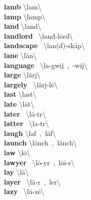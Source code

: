 \documentclass[10pt,a4paper]{article}
\begin{document}
\begin{multicols}{2}
\textbf{ lamb }\quad \textbackslash \textprimstress lam\textbackslash \\
\textbf{ lamp }\quad \textbackslash \textprimstress lamp\textbackslash \\
\textbf{ land }\quad \textbackslash \textprimstress land\textbackslash \\
\textbf{ landlord }\quad \ \textbackslash \textprimstress land-\textsecstress l\.{o}rd\textbackslash \\
\textbf{ landscape }\quad \ \textbackslash \textprimstress lan(d)-\textsecstress sk\={a}p\textbackslash \\
\textbf{ lane }\quad \textbackslash \textprimstress l\={a}n\textbackslash \\
\textbf{ language }\quad \ \textbackslash \textprimstress la\engma -gwij\ ,\ -wij\textbackslash \\
\textbf{ large }\quad \textbackslash \textprimstress l\"{a}rj\textbackslash \\
\textbf{ largely }\quad \ \textbackslash \textprimstress l\"{a}rj-l\={e}\textbackslash \\
\textbf{ last }\quad \textbackslash \textprimstress last\textbackslash \\
\textbf{ late }\quad \textbackslash \textprimstress l\={a}t\textbackslash \\
\textbf{ later }\quad \ \textbackslash \textprimstress l\={a}-t\textschwa r\textbackslash \\
\textbf{ latter }\quad \ \textbackslash \textprimstress la-t\textschwa r\textbackslash \\
\textbf{ laugh }\quad \textbackslash \textprimstress laf\ ,\ \textprimstress l\"{a}f\textbackslash \\
\textbf{ launch }\quad \textbackslash \textprimstress l\.{o}nch\ ,\ \textprimstress l\"{a}nch\textbackslash \\
\textbf{ law }\quad \textbackslash \textprimstress l\.{o}\textbackslash \\
\textbf{ lawyer }\quad \ \textbackslash \textprimstress l\.{o}-y\textschwa r\ ,\ \textprimstress l\.{o}i-\textschwa r\textbackslash \\
\textbf{ lay }\quad \textbackslash \textprimstress l\={a}\textbackslash \\
\textbf{ layer }\quad \ \textbackslash \textprimstress l\={a}-\textschwa r\ ,\ \textprimstress ler\textbackslash \\
\textbf{ lazy }\quad \ \textbackslash \textprimstress l\={a}-z\={e}\textbackslash \\

\end{multicols}
\end{document}

